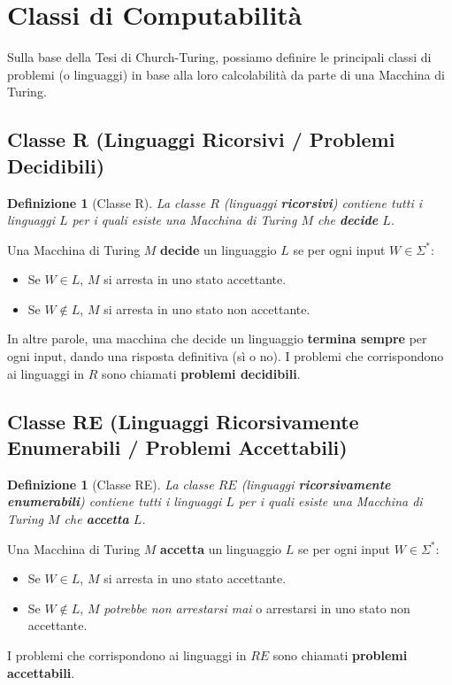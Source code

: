 \documentclass[a4paper, 11pt]{book} %
\newtheorem{definition}[theorem]{Definizione}
\theoremstyle{definition}
\begin{document}
\section{Classi di Computabilità}

Sulla base della Tesi di Church-Turing, possiamo definire le principali classi di problemi (o linguaggi) in base alla loro calcolabilità da parte di una Macchina di Turing.


\subsection{Classe R (Linguaggi Ricorsivi / Problemi Decidibili)}
\begin{definition}[Classe R]
La classe $R$ (linguaggi \textbf{ricorsivi}) contiene tutti i linguaggi $L$ per i quali esiste una Macchina di Turing $M$ che \textbf{decide} $L$.
\end{definition}
Una Macchina di Turing $M$ \textbf{decide} un linguaggio $L$ se per ogni input $W \in \Sigma^*$:
\begin{itemize}
    \item Se $W \in L$, $M$ si arresta in uno stato accettante.
    \item Se $W \notin L$, $M$ si arresta in uno stato non accettante.
\end{itemize}
In altre parole, una macchina che decide un linguaggio \textbf{termina sempre} per ogni input, dando una risposta definitiva (sì o no). I problemi che corrispondono ai linguaggi in $R$ sono chiamati \textbf{problemi decidibili}.

\subsection{Classe RE (Linguaggi Ricorsivamente Enumerabili / Problemi Accettabili)}
\begin{definition}[Classe RE]
La classe $RE$ (linguaggi \textbf{ricorsivamente enumerabili}) contiene tutti i linguaggi $L$ per i quali esiste una Macchina di Turing $M$ che \textbf{accetta} $L$.
\end{definition}
Una Macchina di Turing $M$ \textbf{accetta} un linguaggio $L$ se per ogni input $W \in \Sigma^*$:
\begin{itemize}
    \item Se $W \in L$, $M$ si arresta in uno stato accettante.
    \item Se $W \notin L$, $M$ \emph{potrebbe non arrestarsi mai} o arrestarsi in uno stato non accettante.
\end{itemize}
I problemi che corrispondono ai linguaggi in $RE$ sono chiamati \textbf{problemi accettabili}.
\end{document}
